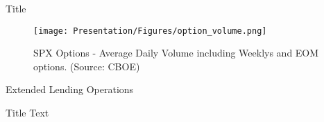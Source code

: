

\begin{frame}{Title}
\begin{figure}[h]
\label{prices}
\centering
\texttt{[image: Presentation/Figures/option\_volume.png]}
\caption[SPX Options - Average Daily Volume]{SPX Options - Average Daily Volume including Weeklys and EOM options. (Source: CBOE)}
\end{figure}  
\end{frame}


\begin{frame}{Extended Lending Operations}
    \begin{block}{Title}
    Text
    \end{block}
\end{frame}